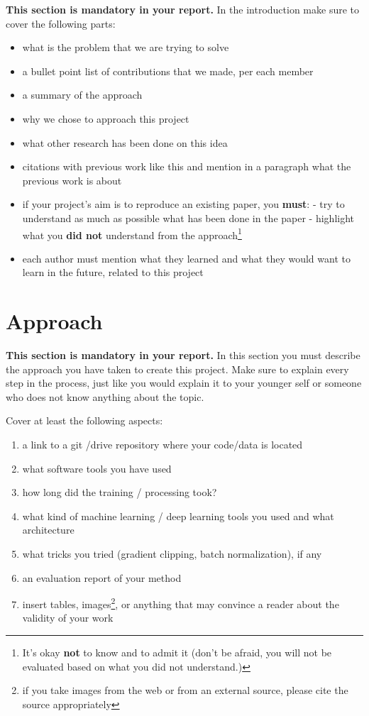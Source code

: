 \documentclass[11pt]{article}
\begin{document}
\textbf{This section is mandatory in your report.} In the introduction make sure to cover the following parts:
\begin{itemize}
	\item what is the problem that we are trying to solve
	\item a bullet point list of contributions that we made, per each member
	\item a summary of the approach
	\item why we chose to approach this project
	\item what other research has been done on this idea
	\item citations with previous work like this \cite{Aho:72} and mention in a paragraph what the previous work is about
	\item if your project's aim is to reproduce an existing paper, you \textbf{must}:
	\subitem - try to understand as much as possible what has been done in the paper
	\subitem - highlight what you \textbf{did not} understand from the approach\footnote{It's okay \textbf{not} to know and to admit it (don't be afraid, you will not be evaluated based on what you did not understand.)}
	\item each author must mention what they learned and what they would want to learn in the future, related to this project
\end{itemize}



\section{Approach}
\label{section:approach}

\textbf{This section is mandatory in your report.}  In this section you must describe the approach you have taken to create this project.
Make sure to explain every step in the process, just like you would explain it to your younger self or someone who does not know anything about the topic.

Cover at least the following aspects:
\begin{enumerate}
 	\item a link to a git /drive repository where your code/data is located
	\item what software tools you have used
	\item how long did the training / processing took?
	\item what kind of machine learning / deep learning tools you used and what architecture
	\item what tricks you tried (gradient clipping, batch normalization), if any
	\item an evaluation report of your method
	\item insert tables, images\footnote{if you take images from the web or from an external source, please cite the source appropriately}, or anything that may convince a reader about the validity of your work
\end{enumerate}
\end{document}
